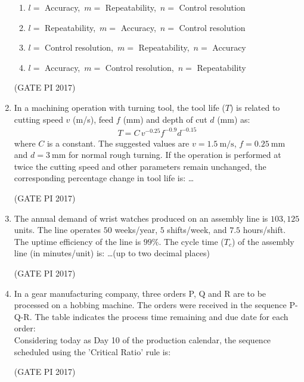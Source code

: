 \documentclass[journal,12pt,onecolumn]{IEEEtran}
\theoremstyle{remark}
\begin{document}
\begin{enumerate}
\begin{enumerate}
\item $l=$ Accuracy,\ $m=$ Repeatability,\ $n=$ Control resolution
\item $l=$ Repeatability,\ $m=$ Accuracy,\ $n=$ Control resolution
\item $l=$ Control resolution,\ $m=$ Repeatability,\ $n=$ Accuracy
\item $l=$ Accuracy,\ $m=$ Control resolution,\ $n=$ Repeatability
\end{enumerate}
\hfill (GATE PI 2017)

\item In a machining operation with turning tool, the tool life ($T$) is related to cutting speed $v$ (m/s), feed $f$ (mm) and depth of cut $d$ (mm) as:  
\begin{align*}
T = C\, v^{-0.25} f^{-0.9} d^{-0.15}
\end{align*}
where $C$ is a constant. The suggested values are $v = 1.5 \ \text{m/s}$, $f = 0.25 \ \text{mm}$ and $d = 3 \ \text{mm}$ for normal rough turning.  
If the operation is performed at twice the cutting speed and other parameters remain unchanged,  
the corresponding percentage change in tool life is:  
\dots

\hfill (GATE PI 2017)

\item The annual demand of wrist watches produced on an assembly line is $103{,}125$ units.  
The line operates $50$ weeks/year, $5$ shifts/week, and $7.5$ hours/shift.  
The uptime efficiency of the line is $99\%$.  
The cycle time ($T_c$) of the assembly line (in minutes/unit) is:  
\dots (up to two decimal places)  

\hfill (GATE PI 2017)

\item In a gear manufacturing company, three orders P, Q and R are to be processed on a hobbing machine.  
The orders were received in the sequence P\--Q\--R. The table indicates the process time remaining and due date for each order: \\




Considering today as Day 10 of the production calendar,  
the sequence scheduled using the 'Critical Ratio' rule is:
\begin{enumerate}
\end{enumerate}
\hfill (GATE PI 2017)


\end{enumerate}
\end{document}

